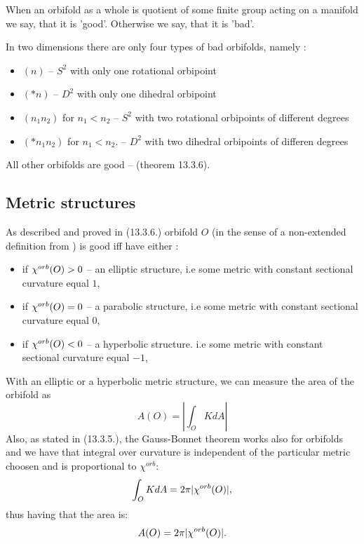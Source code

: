 When an orbifold as a whole is quotient of some finite group acting on a manifold we say, that 
it is 'good'. Otherwise we say, that it is 'bad'. 


In two dimensions there are only four types of bad orbifolds, namely
: 
\begin{itemize}
\item $(n)$ -- $S^2$ with only one rotational orbipoint 
\item $(*n)$ -- $D^2$ with only one dihedral orbipoint
\item $(n_1n_2)$ for $n_1 < n_2$ -- $S^2$ with two rotational orbipoints of different degrees 
\item $(*n_1n_2)$ for $n_1 < n_2$. -- $D^2$ with two dihedral orbipoints of differen degrees 
\end{itemize}
All other orbifolds are good -- \cite{Thurston1979} (theorem 13.3.6).

\subsection{Metric structures}
As described and proved in \cite{Thurston1979} (13.3.6.) orbifold $O$ (in the sense of 
a non-extended definition from \cite{THurston1979})
is good iff 
have
either 
:
\begin{itemize}
\item if ${\chi^{orb}(O)} > 0$ -- an elliptic structure, i.e some metric with constant sectional 
curvature equal $1$,  
\item if ${\chi^{orb}(O)} = 0$ -- a parabolic structure, i.e some metric with constant sectional 
curvature equal $0$,
\item if ${\chi^{orb}(O)} < 0$ -- a hyperbolic structure. i.e some metric with constant sectional 
curvature equal $-1$,
\end{itemize}
With an elliptic or a hyperbolic metric structure, we can measure the area of the orbifold as 
\begin{equation}
A(O) = |\int_O K dA|
\end{equation} 
Also, as stated in \cite{Thurston1979} (13.3.5.), the Gauss-Bonnet 
theorem works also for orbifolds 
and we have that integral over curvature is independent of the particular metric choosen 
and is proportional to $\chi^{orb}$:
\begin{equation}
\int_O K dA = 2\pi|{\chi^{orb}(O)}|,
\end{equation}
thus having that the area is:
\begin{equation}\label{area to chi}
A(O) = 2\pi|{\chi^{orb}(O)}|.
\end{equation}

